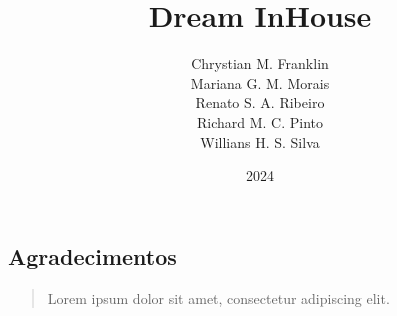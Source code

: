 \documentclass[a4paper,12pt]{article}
\title{{\Huge Dream InHouse}}
\author{
    Chrystian M. Franklin\\
    Mariana G. M. Morais\\
    Renato S. A. Ribeiro\\
    Richard M. C. Pinto\\
    Willians H. S. Silva
}
\date{2024}
\begin{document}
\maketitle
\pagebreak
\begin{centering}
    \section*{Agradecimentos}
    \begin{quotation}
         Lorem ipsum dolor sit amet, consectetur adipiscing elit.
    \end{quotation}
\end{centering}
\pagebreak
\listoffigures
\pagebreak
\tableofcontents
\pagebreak

\pagebreak

\pagebreak

\pagebreak

\pagebreak

\pagebreak

\end{document}
